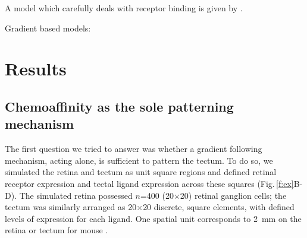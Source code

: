 \documentclass[11pt, a4paper]{article}
\begin{document}
A model which carefully deals with receptor
binding is given by \citet{naoki_revisiting_2017} \citep[see also][]{mortimer_bayesian_2009}.

Gradient based models: \citet{nakamoto_topographically_1996}

\color{black}
\section{Results}

\subsection*{Chemoaffinity as the sole patterning mechanism}

The first question we tried to answer was whether a gradient following
mechanism, acting alone, is sufficient to pattern the tectum. To do so, we
simulated the retina and tectum as unit square regions and defined retinal
receptor expression and tectal ligand expression across these squares
(Fig.\,\ref{f:ex}B-D). The simulated retina possessed $n$=400 (20$\times$20) retinal
ganglion cells; the tectum was similarly arranged as 20$\times$20 discrete, square
elements, with defined levels of expression for each ligand. One spatial unit
corresponds to 2~mm on the retina or tectum for mouse \citep{reber_relative_2004}.
\end{document}

